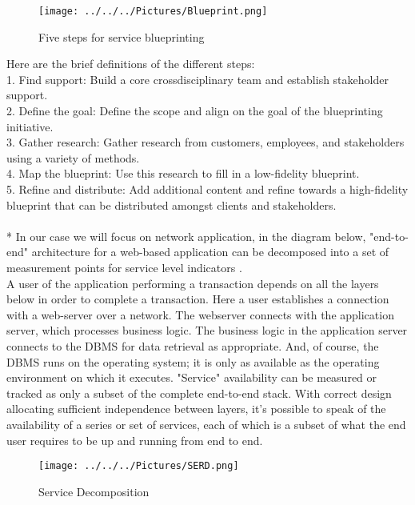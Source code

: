\documentclass[english]{tktltiki2}
\theoremstyle{definition}
\theoremstyle{remark}
\begin{document}
\begin{figure}[h!]
\texttt{[image: ../../../Pictures/Blueprint.png]} 
\caption{Five steps for service blueprinting \cite{Blueprint}}
\label{fig:SB} 
\end{figure}
Here are the brief definitions of the different steps:\\
    1. Find support: Build a core crossdisciplinary team and establish stakeholder support.\\ 
    2. Define the goal: Define the scope and align on the goal of the blueprinting initiative.\\ 
    3. Gather research: Gather research from customers, employees, and stakeholders using a variety of methods.\\
    4. Map the blueprint: Use this research to fill in a low-fidelity blueprint.\\ 
    5. Refine and distribute: Add additional content and refine towards a high-fidelity blueprint that can be distributed amongst clients and stakeholders.\\ \\*
In our case we will focus on network application, in the diagram below,  "end-to-end" architecture for a web-based application can be decomposed into a set of measurement points for service level indicators \cite{AAMES}.\\
A user  of the application performing a transaction depends on all the layers below in order to complete a transaction. Here a user  establishes a connection with a web-server over a network.
The webserver connects with the application server, which processes business logic. The business logic in the application server connects to the DBMS for data retrieval as appropriate. And, of course, the DBMS runs on the operating system; it is only as available as the operating environment on which it executes. "Service" availability can be measured or tracked as only a subset of the complete end-to-end stack. With correct
design allocating sufficient independence between layers, it's possible to speak of the availability of a series or set of services, each of which is a subset of what the end user requires to be up and running from end to end.

\begin{figure}[h!]
\texttt{[image: ../../../Pictures/SERD.png]} 
\caption{Service Decomposition \cite{AAMES}}
\label{fig:SD} 
\end{figure}
\end{document}
